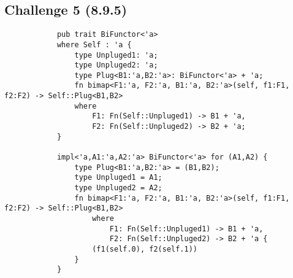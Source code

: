 \documentclass[11pt]{article}
\begin{document}
    \subsection*{Challenge 5 (8.9.5)}
        \begin{verbatim}
            pub trait BiFunctor<'a> 
            where Self : 'a {
                type Unpluged1: 'a;
                type Unpluged2: 'a;
                type Plug<B1:'a,B2:'a>: BiFunctor<'a> + 'a;
                fn bimap<F1:'a, F2:'a, B1:'a, B2:'a>(self, f1:F1, f2:F2) -> Self::Plug<B1,B2>
                where
                    F1: Fn(Self::Unpluged1) -> B1 + 'a,
                    F2: Fn(Self::Unpluged2) -> B2 + 'a;
            }

            impl<'a,A1:'a,A2:'a> BiFunctor<'a> for (A1,A2) {
                type Plug<B1:'a,B2:'a> = (B1,B2);
                type Unpluged1 = A1;
                type Unpluged2 = A2;
                fn bimap<F1:'a, F2:'a, B1:'a, B2:'a>(self, f1:F1, f2:F2) -> Self::Plug<B1,B2>
                    where
                        F1: Fn(Self::Unpluged1) -> B1 + 'a,
                        F2: Fn(Self::Unpluged2) -> B2 + 'a {
                    (f1(self.0), f2(self.1))
                }
            }
        \end{verbatim}
\end{document}
